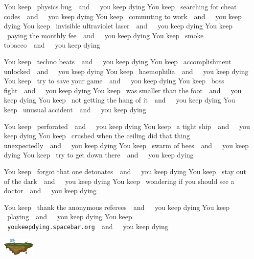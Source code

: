 \documentclass[twocolumn]{article}
\newcommand\ykd[1]{You keep ~{#1}~~and~~~you keep dying\qquad}
\begin{document}
\ykd{physics bug}
\ykd{searching for cheat codes}
\ykd{commuting to work}
\ykd{invisible ultraviolet laser}
\ykd{paying the monthly fee}
\ykd{smoke tobacco}

\vspace{0.45in}
\ykd{techno beats}
\ykd{accomplishment unlocked}
\ykd{haemophilia}
\ykd{try to save your game}
\ykd{boss fight}
\ykd{was smaller than the foot}
\ykd{not getting the hang of it}
\ykd{unusual accident}

\ykd{perforated}
\ykd{a tight ship}
\ykd{crushed when the ceiling did that thing unexpectedly}
\ykd{swarm of bees}
\ykd{try to get down there}

\vspace{0.25in}
\ykd{forgot that one detonates}
\ykd{stay out of the dark}
\ykd{wondering if you should see a doctor}

\vspace{0.25in}
\ykd{thank the anonymous referees}
\ykd{playing}
\ykd{{\tt youkeepdying.spacebar.org}}

\vspace{0.4in}
\qquad\qquad\qquad\includegraphics[width=0.12\textwidth]{platform}
\end{document}
